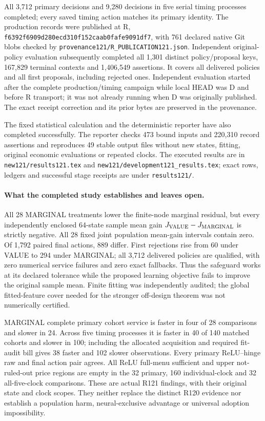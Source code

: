 All 3,712 primary decisions and 9,280 decisions in five serial timing
processes completed; every saved timing action matches its primary identity.
The production records were published at R,
\nolinkurl{f6392f6909d280ecd310f152caab0fafe9091df7}, with 761 declared
native Git blobs checked by \nolinkurl{provenance121/R_PUBLICATION121.json}.
Independent original-policy evaluation subsequently completed all 1,301
distinct policy/proposal keys, 167,829 terminal contexts and 1,406,549
assertions. It covers all delivered policies and all first proposals,
including rejected ones. Independent evaluation started after the complete
production/timing campaign while local HEAD was D and before R transport;
it was not already running when D was originally published. The exact
receipt correction and its prior bytes are preserved in the provenance.

The fixed statistical calculation and the deterministic reporter have also
completed successfully. The reporter checks 473 bound inputs and 220,310
record assertions and reproduces 49 stable output files without new states,
fitting, original economic evaluations or repeated clocks. The executed
results are in \nolinkurl{new121/results121.tex} and
\nolinkurl{new121/development121_results.tex}; exact rows, ledgers and
successful stage receipts are under \nolinkurl{results121/}.

\paragraph{What the completed study establishes and leaves open.}
All 28 MARGINAL treatments lower the finite-node marginal residual, but
every independently enclosed 64-state sample mean gain
$J_{\rm VALUE}-J_{\rm MARGINAL}$ is strictly negative. All 28 fixed joint
population mean-gain intervals contain zero. Of 1,792 paired final actions,
889 differ. First rejections rise from 60 under VALUE to 294 under MARGINAL;
all 3,712 delivered policies are qualified, with zero numerical service
failures and zero exact fallbacks. Thus the safeguard works at its declared
tolerance while the proposed learning objective fails to improve the
original sample mean. Finite fitting was independently audited; the global
fitted-feature cover needed for the stronger off-design theorem was not
numerically certified.

MARGINAL complete primary cohort service is faster in four of 28 comparisons
and slower in 24. Across five timing processes it is faster in 40 of 140
matched cohorts and slower in 100; including the allocated acquisition and
required fit-audit bill gives 38 faster and 102 slower observations. Every
primary ReLU--hinge raw and final action pair agrees. All ReLU full-menu
sufficient and upper not-ruled-out price regions are empty in the 32 primary,
160 individual-clock and 32 all-five-clock comparisons. These are actual
R121 findings, with their original state and clock scopes. They neither
replace the distinct R120 evidence nor establish a population harm,
neural-exclusive advantage or universal adoption impossibility.

